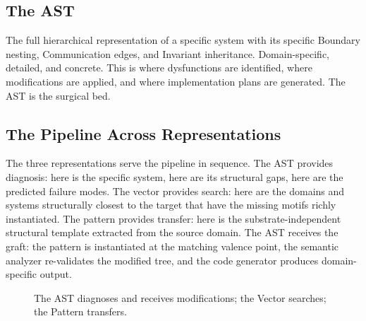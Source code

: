 \documentclass[11pt,a4paper]{article}
\begin{document}
\subsection{The AST}

The full hierarchical representation of a specific system with its specific Boundary nesting, Communication edges, and Invariant inheritance. Domain-specific, detailed, and concrete. This is where dysfunctions are identified, where modifications are applied, and where implementation plans are generated. The AST is the surgical bed.

\subsection{The Pipeline Across Representations}

The three representations serve the pipeline in sequence. The AST provides diagnosis: here is the specific system, here are its structural gaps, here are the predicted failure modes. The vector provides search: here are the domains and systems structurally closest to the target that have the missing motifs richly instantiated. The pattern provides transfer: here is the substrate-independent structural template extracted from the source domain. The AST receives the graft: the pattern is instantiated at the matching valence point, the semantic analyzer re-validates the modified tree, and the code generator produces domain-specific output.

\begin{figure}[ht]
\centering
{}
\caption{The AST diagnoses and receives modifications; the Vector searches; the Pattern transfers.}
\end{figure}
\end{document}
